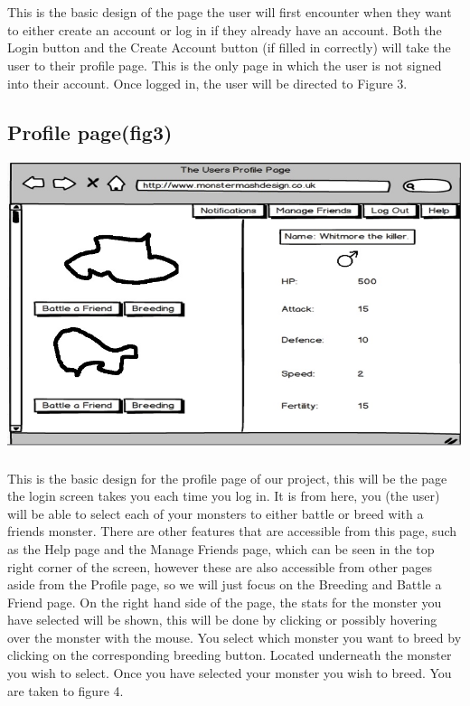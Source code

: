 \documentclass{project}
\begin{document}
\\
\\
This is the basic design of the page the user will first encounter when they want to
either create an account or log in if they already have an account. Both the Login
button and the Create Account button (if filled in correctly) will take the user to
their profile page. This is the only page in which the user is not signed into their
account.
Once logged in, the user will be directed to Figure 3.


\subsection{Profile page(fig3)}
\includegraphics[scale=0.5]{userProfile.jpg}
\\
\\
This is the basic design for the profile page of our project, this will be the page
the login screen takes you each time you log in. It is from here, you (the user)
will be able to select each of your monsters to either battle or breed with a friends
monster. There are other features that are accessible from this page, such as the
Help page and the Manage Friends page, which can be seen in the top right corner of
the screen, however these are also accessible from other pages aside from the Profile
page, so we will just focus on the Breeding and Battle a Friend page.
On the right hand side of the page, the stats for the monster you have selected
will be shown, this will be done by clicking or possibly hovering over the monster
with the mouse.
You select which monster you want to breed by clicking on the corresponding
breeding button. Located underneath the monster you wish to select. Once you
have selected your monster you wish to breed. You are taken to figure 4.
\newpage
\end{document}
